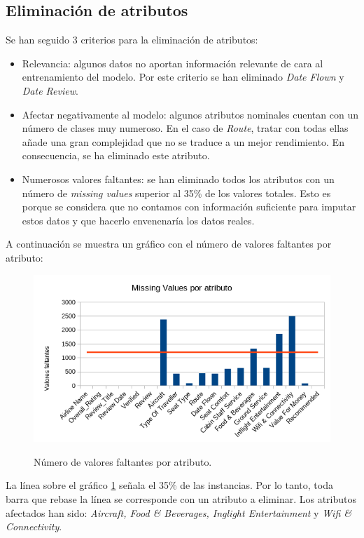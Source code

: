 \documentclass[es]{uc3mreport}
\begin{document}
\begin{report}
\subsection{Eliminación de atributos}
\label{sec:delete_columns}
Se han seguido 3 criterios para la eliminación de atributos:
\begin{itemize}
    \item Relevancia: algunos datos no aportan información relevante de cara al entrenamiento del modelo. Por este criterio se han eliminado \textit{Date Flown} y \textit{Date Review}.
    \item Afectar negativamente al modelo: algunos atributos nominales cuentan con un número de clases muy numeroso. En el caso de \textit{Route}, tratar con todas ellas añade una gran complejidad que no se traduce a un mejor rendimiento. En consecuencia, se ha eliminado este atributo.
    \item Numerosos valores faltantes: se han eliminado todos los atributos con un número de \textit{missing values} superior al 35\% de los valores totales. Esto es porque se considera que no contamos con información suficiente para imputar estos datos y que hacerlo envenenaría los datos reales. 
\end{itemize}
A continuación se muestra un gráfico con el número de valores faltantes por atributo:

\begin{figure}[H]
    \center
    \includegraphics[width=0.85\linewidth]{missings.png}\\
    \caption{Número de valores faltantes por atributo.}
    \label{fig:missings}
\end{figure}

La línea sobre el gráfico \ref{fig:missings} señala el 35\% de las instancias. Por lo tanto, toda barra que rebase la línea se corresponde con un atributo a eliminar. Los atributos afectados han sido: \textit{Aircraft, Food \& Beverages, Inglight Entertainment} y \textit{Wifi \& Connectivity}.


\end{report}
\end{document}
